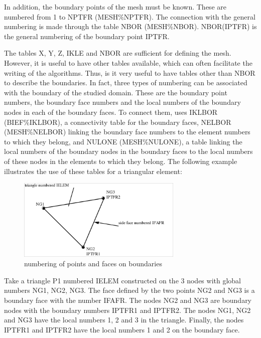 In addition, the boundary points of the mesh must be known. These are numbered
from 1 to NPTFR (MESH\%NPTFR). The connection with the general numbering is
made through the table NBOR (MESH\%NBOR). NBOR(IPTFR) is the general numbering of
the boundary point IPTFR.

The tables X, Y, Z, IKLE and NBOR are sufficient for defining the mesh.
However, it is useful to have other tables available, which can often
facilitate the writing of the algorithms. Thus, is it very useful to have
tables other than NBOR to describe the boundaries. In fact, three types of
numbering can be associated with the boundary of the studied domain. These are
the boundary point numbers, the boundary face numbers and the local numbers of
the boundary nodes in each of the boundary faces. To connect them, \bief uses
IKLBOR (BIEF\%IKLBOR), a connectivity table for the boundary faces, NELBOR
(MESH\%NELBOR) linking the boundary face numbers to the element numbers to
which they belong, and NULONE (MESH\%NULONE), a table linking the local numbers
of the boundary nodes in the boundary faces to the local numbers of these nodes
in the elements to which they belong. The following example illustrates the use
of these tables for a triangular element:

\begin{figure}[H]%
\begin{center}
%
  \includegraphics[width=0.7\textwidth]{./graphics/triangle}
%
\end{center}
\caption{numbering of points and faces on boundaries}
\label{fig:triangle}
\end{figure}

Take a triangle P1 numbered IELEM constructed on the 3 nodes with global
numbers NG1, NG2, NG3. The face defined by the two points NG2 and NG3 is a
boundary face with the number IFAFR. The nodes NG2 and NG3 are boundary nodes
with the boundary numbers IPTFR1 and IPTFR2. The nodes NG1, NG2 and NG3 have
the local numbers 1, 2 and 3 in the triangle. Finally, the nodes IPTFR1 and
IPTFR2 have the local numbers 1 and 2 on the boundary face.

